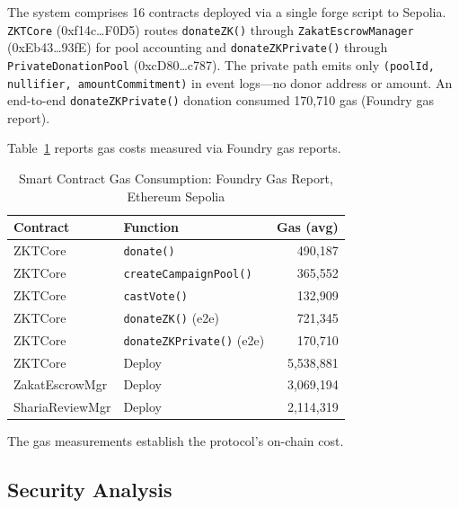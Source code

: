 \documentclass[conference]{IEEEtran}
\begin{document}
The system comprises 16 contracts deployed via a single forge script to Sepolia\cite{b_ziswaf_blockchain}. \texttt{ZKTCore} (0xf14c…F0D5) routes \texttt{donateZK()} through \texttt{ZakatEscrowManager} (0xEb43…93fE) for pool accounting and \texttt{donateZKPrivate()} through \texttt{PrivateDonationPool} (0xcD80…c787). The private path emits only \texttt{(poolId, nullifier, amountCommitment)} in event logs---no donor address or amount\cite{b_zkfi}\cite{b_zkp_financial}. An end-to-end \texttt{donateZKPrivate()} donation consumed 170,710 gas (Foundry gas report).

Table~\ref{tab:gas} reports gas costs measured via Foundry gas reports.

\begin{table}[htbp]
\caption{Smart Contract Gas Consumption: Foundry Gas Report, Ethereum Sepolia}
\label{tab:gas}
\footnotesize
\setlength{\tabcolsep}{3pt}
\begin{center}
\begin{tabular}{|l|l|r|}
\hline
\textbf{Contract} & \textbf{Function} & \textbf{Gas (avg)} \\
\hline
ZKTCore              & \texttt{donate()}                 & 490,187 \\
ZKTCore              & \texttt{createCampaignPool()}     & 365,552 \\
ZKTCore              & \texttt{castVote()}               & 132,909 \\
ZKTCore              & \texttt{donateZK()} (e2e)          & 721,345 \\
ZKTCore              & \texttt{donateZKPrivate()} (e2e)    & 170,710 \\
\hline
ZKTCore              & Deploy                            & 5,538,881 \\
ZakatEscrowMgr       & Deploy                            & 3,069,194 \\
ShariaReviewMgr      & Deploy                            & 2,114,319 \\
\hline
\end{tabular}
\end{center}
\end{table}

The gas measurements establish the protocol's on-chain cost\cite{b_zkp_financial}\cite{b_hybrid_zk}.

\subsection{Security Analysis}
\end{document}
